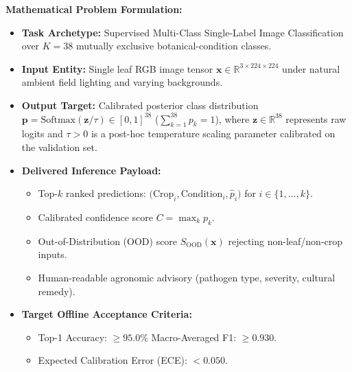\documentclass[8pt]{article}
\begin{document}
\vspace{2mm}%

\noindent%
\begin{minipage}[t]{0.327\linewidth}%
  \begin{tcolorbox}[
    canvasbox,
    colback=bgModel,
    colframe=headModel,
    title={4. PREDICTION TASK (ML TASK)},
    boxed title style={colback=headModel},
    height=68mm
  ]
  \fontsize{7.2pt}{8.8pt}\selectfont
  \textbf{Mathematical Problem Formulation:}
  \vspace{1mm}
  \begin{itemize}
    \item \textbf{Task Archetype:} Supervised Multi-Class Single-Label Image Classification over $K = 38$ mutually exclusive botanical-condition classes.
    \item \textbf{Input Entity:} Single leaf RGB image tensor $\mathbf{x} \in \mathbb{R}^{3 \times 224 \times 224}$ under natural ambient field lighting and varying backgrounds.
    \item \textbf{Output Target:} Calibrated posterior class distribution $\mathbf{p} = \text{Softmax}(\mathbf{z}/\tau) \in [0,1]^{38}$ ($\sum_{k=1}^{38} p_k = 1$), where $\mathbf{z} \in \mathbb{R}^{38}$ represents raw logits and $\tau > 0$ is a post-hoc temperature scaling parameter calibrated on the validation set.
    \item \textbf{Delivered Inference Payload:}
      \begin{itemize}
        \item Top-$k$ ranked predictions: $\big(\text{Crop}_i, \text{Condition}_i, \hat{p}_i\big)$ for $i \in \{1,\dots, k\}$.
        \item Calibrated confidence score $C = \max_k p_k$.
        \item Out-of-Distribution (OOD) score $S_{\text{OOD}}(\mathbf{x})$ rejecting non-leaf/non-crop inputs.
        \item Human-readable agronomic advisory (pathogen type, severity, cultural remedy).
      \end{itemize}
    \item \textbf{Target Offline Acceptance Criteria:}
      \begin{itemize}
        \item Top-1 Accuracy: $\ge 95.0\%$ \quad\textbar\quad Macro-Averaged F1: $\ge 0.930$.
        \item Expected Calibration Error (ECE): $< 0.050$.
      \end{itemize}
  \end{itemize}
  \end{tcolorbox}%
\end{minipage}\hfill%
\end{document}
